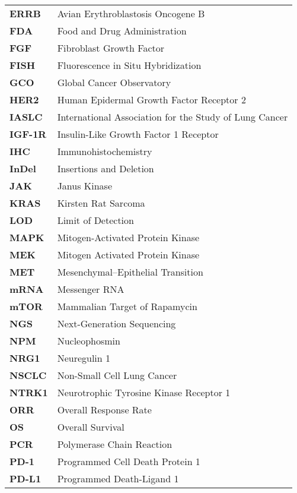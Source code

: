 \begin{longtable}[l]{l l}
    \textbf{ERRB} & Avian Erythroblastosis Oncogene B \\
    \textbf{FDA} & Food and Drug Administration \\
    \textbf{FGF} & Fibroblast Growth Factor \\
    \textbf{FISH} & Fluorescence in Situ Hybridization \\
    \textbf{GCO} & Global Cancer Observatory \\
    \textbf{HER2} & Human Epidermal Growth Factor Receptor 2 \\
    \textbf{IASLC} & International Association for the Study of Lung Cancer \\
    \textbf{IGF-1R} & Insulin-Like Growth Factor 1 Receptor \\
    \textbf{IHC} & Immunohistochemistry \\
    \textbf{InDel} & Insertions and Deletion \\
    \textbf{JAK} & Janus Kinase \\
    \textbf{KRAS} & Kirsten Rat Sarcoma \\
    \textbf{LOD} & Limit of Detection \\
    \textbf{MAPK} & Mitogen-Activated Protein Kinase \\
    \textbf{MEK} & Mitogen Activated Protein Kinase \\
    \textbf{MET} & Mesenchymal–Epithelial Transition \\
    \textbf{mRNA} & Messenger RNA \\
    \textbf{mTOR} & Mammalian Target of Rapamycin \\
    \textbf{NGS} & Next-Generation Sequencing \\
    \textbf{NPM} & Nucleophosmin \\
    \textbf{NRG1} & Neuregulin 1 \\
    \textbf{NSCLC} & Non-Small Cell Lung Cancer \\
    \textbf{NTRK1} & Neurotrophic Tyrosine Kinase Receptor 1 \\
    \textbf{ORR} &  Overall Response Rate \\
    \textbf{OS} & Overall Survival \\
    \textbf{PCR} & Polymerase Chain Reaction \\
    \textbf{PD-1} & Programmed Cell Death Protein 1 \\
    \textbf{PD-L1} & Programmed Death-Ligand 1 \\

\end{longtable}

